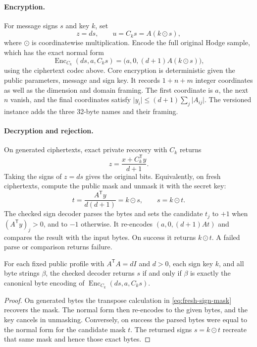 \paragraph{Encryption.}
For message signs \(s\) and key \(k\), set
\[
 z=ds,\qquad u=C_ks=A(k\mathbin\odot s),
\]
where \(\odot\) is coordinatewise multiplication. Encode the full original
Hodge sample, which has the exact normal form
\[
 \operatorname{Enc}_{C_k}(ds,a,C_ks)
   =\bigl(a,0,(d+1)A(k\mathbin\odot s)\bigr),
\]
using the ciphertext codec above. Core encryption is deterministic given
the public parameters, message and sign key. It records \(1+n+m\)
integer coordinates as well as the dimension and domain framing. The first
coordinate is \(a\), the next \(n\) vanish, and the final coordinates satisfy
\(\lvert y_i\rvert\leq (d+1)\sum_j\lvert A_{ij}\rvert\). The versioned
instance adds the three 32-byte names and their framing.

\paragraph{Decryption and rejection.}
On generated ciphertexts, exact private recovery with \(C_k\) returns
\[
 z=\frac{x+C_k^{\mathsf T}y}{d+1}.
\]
Taking the signs of \(z=ds\) gives the original bits. Equivalently, on fresh
ciphertexts, compute the public mask and unmask it with the secret key:
\begin{equation}
 t=\frac{A^{\mathsf T}y}{d(d+1)}=k\mathbin\odot s,
 \qquad s=k\mathbin\odot t.
 \label{eq:fresh-sign-mask}
\end{equation}
The checked sign decoder parses the bytes and sets the candidate \(t_j\)
to \(+1\) when \((A^{\mathsf T}y)_j>0\), and to \(-1\) otherwise. It
re-encodes \((a,0,(d+1)At)\) and compares the result with the input bytes.
On success it returns \(k\mathbin\odot t\). A failed parse or comparison
returns failure.

\begin{proposition}
\label{prop:coupled-sign-checked-recovery}
For each fixed public profile with \(A^{\mathsf T}A=dI\) and \(d>0\),
each sign key \(k\), and all byte strings \(\beta\), the checked decoder
returns \(s\) if and only if \(\beta\) is exactly the canonical byte encoding
of \(\operatorname{Enc}_{C_k}(ds,a,C_ks)\).
\end{proposition}

\begin{proof}
On generated bytes the transpose calculation in \eqref{eq:fresh-sign-mask}
recovers the mask. The normal form then re-encodes to the given bytes, and
the key cancels in unmasking. Conversely, on success the parsed bytes were
equal to the normal form for the candidate mask \(t\). The returned signs
\(s=k\mathbin\odot t\) recreate that same mask and hence those exact bytes.
\end{proof}

